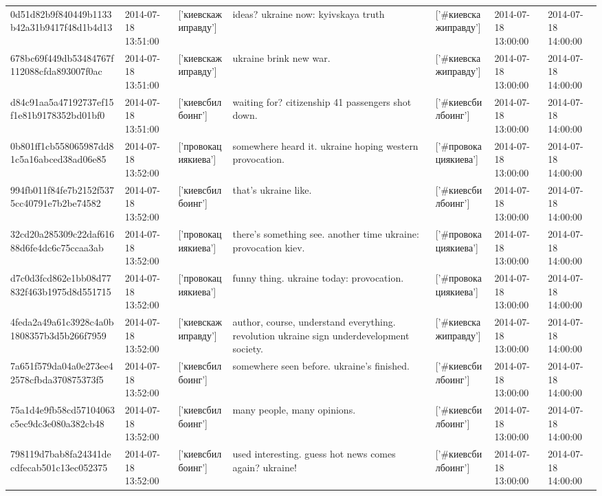 \begin{tabular}{lllllll}
0d51d82b9f840449b1133b42a31b9417f48d1b4d13 & 2014-07-18 13:51:00 & ['киевскажиправду'] & ideas? ukraine now: kyivskaya truth & ['#киевскажиправду'] & 2014-07-18 13:00:00 & 2014-07-18 14:00:00 \\
678bc69f449db53484767f112088cfda893007f0ac & 2014-07-18 13:51:00 & ['киевскажиправду'] & ukraine brink new war. & ['#киевскажиправду'] & 2014-07-18 13:00:00 & 2014-07-18 14:00:00 \\
d84c91aa5a47192737ef15f1e81b9178352bd01bf0 & 2014-07-18 13:51:00 & ['киевсбилбоинг'] & waiting for? citizenship 41 passengers shot down. & ['#киевсбилбоинг'] & 2014-07-18 13:00:00 & 2014-07-18 14:00:00 \\
0b801ff1cb558065987dd81c5a16abced38ad06e85 & 2014-07-18 13:52:00 & ['провокациякиева'] & somewhere heard it. ukraine hoping western provocation. & ['#провокациякиева'] & 2014-07-18 13:00:00 & 2014-07-18 14:00:00 \\
994fb011f84fe7b2152f5375cc40791e7b2be74582 & 2014-07-18 13:52:00 & ['киевсбилбоинг'] & that's ukraine like. & ['#киевсбилбоинг'] & 2014-07-18 13:00:00 & 2014-07-18 14:00:00 \\
32cd20a285309c22daf61688d6fe4dc6c75ccaa3ab & 2014-07-18 13:52:00 & ['провокациякиева'] & there's something see. another time ukraine: provocation kiev. & ['#провокациякиева'] & 2014-07-18 13:00:00 & 2014-07-18 14:00:00 \\
d7c0d3fcd862e1bb08d77832f463b1975d8d551715 & 2014-07-18 13:52:00 & ['провокациякиева'] & funny thing. ukraine today: provocation. & ['#провокациякиева'] & 2014-07-18 13:00:00 & 2014-07-18 14:00:00 \\
4feda2a49a61c3928c4a0b1808357b3d5b266f7959 & 2014-07-18 13:52:00 & ['киевскажиправду'] & author, course, understand everything. revolution ukraine sign underdevelopment society. & ['#киевскажиправду'] & 2014-07-18 13:00:00 & 2014-07-18 14:00:00 \\
7a651f579da04a0e273ee42578cfbda370875373f5 & 2014-07-18 13:52:00 & ['киевсбилбоинг'] & somewhere seen before. ukraine's finished. & ['#киевсбилбоинг'] & 2014-07-18 13:00:00 & 2014-07-18 14:00:00 \\
75a1d4e9fb58cd57104063c5ec9dc3e080a382cb48 & 2014-07-18 13:52:00 & ['киевсбилбоинг'] & many people, many opinions. & ['#киевсбилбоинг'] & 2014-07-18 13:00:00 & 2014-07-18 14:00:00 \\
798119d7bab8fa24341decdfecab501c13ec052375 & 2014-07-18 13:52:00 & ['киевсбилбоинг'] & used interesting. guess hot news comes again? ukraine! & ['#киевсбилбоинг'] & 2014-07-18 13:00:00 & 2014-07-18 14:00:00 \\

\end{tabular}
